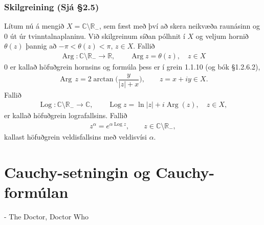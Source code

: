 \documentclass[a4paper,10pt,icelandic]{sphinxmanual}
\begin{document}
\subsection{Skilgreining (Sjá \S{}2.5)}
\label{\detokenize{Kafli02:skilgreining-sja-2-5}}
Lítum nú á mengið \(X={\mathbb{C}}\setminus \mathbb{R}_-\), sem fæst með því að skera neikvæða raunásinn og \(0\) út úr tvinntalnaplaninu. Við skilgreinum síðan pólhnit í \(X\) og veljum hornið \(\theta(z)\) þannig að \(-\pi<\theta(z)<\pi\), \(z\in X\). Fallið
\begin{equation*}
\begin{split}{\operatorname{Arg}} :{\mathbb{C}}\setminus \mathbb{R}_-\to \mathbb{R}, \qquad
{\operatorname{Arg}} z=\theta(z),\quad z\in X\end{split}
\end{equation*}
0 er kallað höfuðgrein hornsins og formúla þess er í grein 1.1.10 (og bók \S{}1.2.6.2),
\begin{equation*}
\begin{split}{\operatorname{Arg}}\, z=2\arctan\bigg(\dfrac y{|z|+x}\bigg), \qquad z=x+iy\in X.\end{split}
\end{equation*}
Fallið
\begin{equation*}
\begin{split}{\operatorname{Log}} :{\mathbb{C}}\setminus \mathbb{R}_-\to {\mathbb{C}}, \qquad
{\operatorname{Log}} z=\ln |z| +i{\operatorname{Arg}}(z),\quad z\in X,\end{split}
\end{equation*}
er kallað höfuðgrein lografallsins. Fallið
\begin{equation*}
\begin{split}z^\alpha = e^{\alpha{\operatorname{Log}} z}, \qquad z\in {\mathbb{C}}\setminus \mathbb{R}_-,\end{split}
\end{equation*}
kallast höfuðgrein veldisfallsins með veldisvísi \(\alpha\).


\chapter{Cauchy-setningin og Cauchy-formúlan}
\label{\detokenize{Kafli03:cauchy-setningin-og-cauchy-formulan}}\label{\detokenize{Kafli03::doc}}

- The Doctor, Doctor Who
\end{document}
